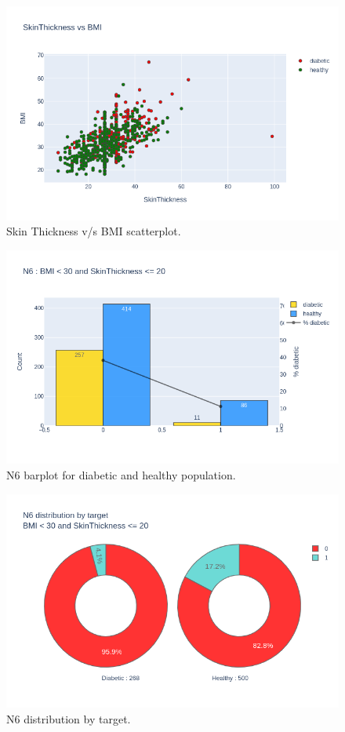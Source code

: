 \documentclass[12pt]{article}
\begin{document}
\begin{figure}[ht]
\centering
\includegraphics[width=1\textwidth]{newplot(25).png}
\caption{\label{fig:35} Skin Thickness v/s BMI scatterplot.}
\end{figure}

\begin{figure}[ht]
\centering
\includegraphics[width=1\textwidth]{newplot(26).png}
\caption{\label{fig:36} N6 barplot for diabetic and healthy population.}
\end{figure}

\begin{figure}[ht]
\centering
\includegraphics[width=1\textwidth]{newplot(27).png}
\caption{\label{fig:37} N6 distribution by target.}
\end{figure}
\end{document}
